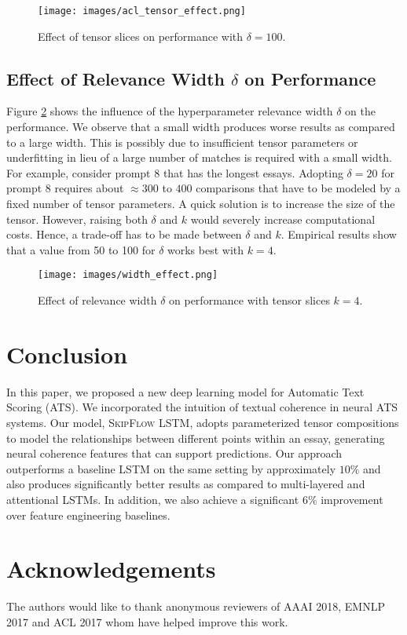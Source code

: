\documentclass[letterpaper]{article}
\begin{document}
\begin{figure}[ht]
  
  \centering
    \texttt{[image: images/acl\_tensor\_effect.png]}
    \caption{Effect of tensor slices on performance with $\delta=100$.}
    \label{fig:tensor_effect}
\end{figure}

\subsection{Effect of Relevance Width $\delta$ on Performance}

Figure \ref{fig:width_effect} shows the influence of the hyperparameter relevance width $\delta$ on the performance. We observe that a small width produces worse results as compared to a large width. This is possibly due to insufficient tensor parameters or underfitting in lieu of a large number of matches is required with a small width. For example, consider prompt 8 that has the longest essays. Adopting $\delta=20$ for prompt 8 requires about $\approx 300$ to $400$ comparisons that have to be modeled by a fixed number of tensor parameters. A quick solution is to increase the size of the tensor. However, raising both $\delta$ and $k$ would severely increase computational costs. Hence, a trade-off has to be made between $\delta$ and $k$. Empirical results show that a value from 50 to 100 for $\delta$ works best with $k=4$. 

\begin{figure}[ht]
  
  \centering
    \texttt{[image: images/width\_effect.png]}
    \caption{Effect of relevance width $\delta$ on performance with tensor slices $k=4$.}
    \label{fig:width_effect}
\end{figure}

\section{Conclusion}
In this paper, we proposed a new deep learning model for Automatic Text Scoring (ATS). We incorporated the intuition of textual coherence in neural ATS systems. Our model, \textsc{SkipFlow} LSTM, adopts parameterized tensor compositions to model the relationships between different points within an essay, generating neural coherence features that can support predictions. Our approach outperforms a baseline LSTM on the same setting by approximately $10\%$ and also produces significantly better results as compared to multi-layered and attentional LSTMs. In addition, we also achieve a significant $6\%$ improvement over feature engineering baselines. 

\section{Acknowledgements}
The authors would like to thank anonymous reviewers of AAAI 2018, EMNLP 2017 and ACL 2017 whom have helped improve this work. 
 

\end{document}
